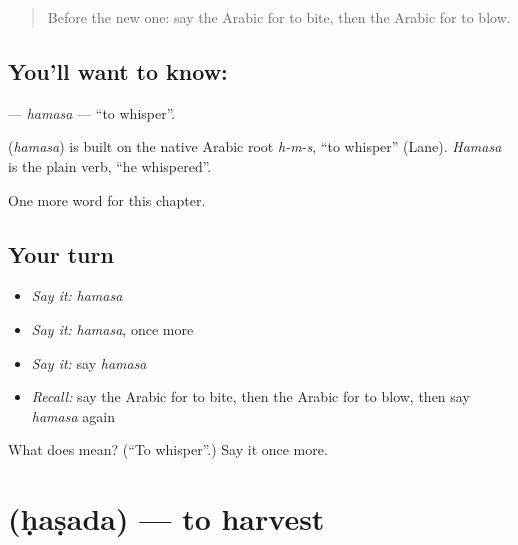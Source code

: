 \label{lesson:AR-C199-hamasa}



\begin{quote}
Before the new one: say the Arabic for to bite, then the Arabic for to blow.
\end{quote}

\subsection*{You'll want to know: }
\textbf{} — \emph{hamasa} — \textquotedblleft{}to whisper\textquotedblright{}.

\begin{cousinweb}
\textbf{} (\emph{hamasa}) is built on the native Arabic root \emph{h-m-s}, \textquotedblleft{}to whisper\textquotedblright{} (Lane). \emph{Hamasa} is the plain verb, \textquotedblleft{}he whispered\textquotedblright{}.
\end{cousinweb}

\begin{grammarlens}[title={What you've built}]
One more word for this chapter.
\end{grammarlens}

\subsection*{Your turn}
\begin{itemize}
\raggedright
  \item \emph{Say it:} \emph{hamasa}
  \item \emph{Say it:} \emph{hamasa}, once more
  \item \emph{Say it:} say \emph{hamasa}
  \item \emph{Recall:} say the Arabic for to bite, then the Arabic for to blow, then say \emph{hamasa} again
\end{itemize}

\begin{tcolorbox}[breakable,colback=teal!4,colframe=teal!35!black,title={Before you move on}]
What does  mean? (\textquotedblleft{}To whisper\textquotedblright{}.) Say it once more.
\end{tcolorbox}
\section[\texorpdfstring{\ar{حصد} (ḥaṣada)}{حصد (ḥaṣada)}]{ (ḥaṣada) — to harvest}

\label{lesson:AR-C199-hasada}



